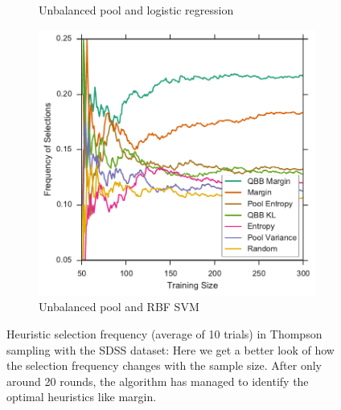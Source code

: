 \begin{figure}[p]
\begin{subfigure}{.5\textwidth}
		\caption{Unbalanced pool and logistic regression}
		\label{fig:sdss_ul_frequencies}
	\end{subfigure}%
	\begin{subfigure}{.5\textwidth}
		\centering
		\includegraphics[width=\linewidth]{figures/5_thompson/sdss_ur_frequencies}
		\caption{Unbalanced pool and RBF SVM}
		\label{fig:sdss_ur_frequencies}
	\end{subfigure}
	\caption[Heuristic selection frequency (SDSS)]{ Heuristic selection frequency (average of 10
        trials) in Thompson sampling with the SDSS dataset: Here we get a better look of how the selection
        frequency changes with the sample size. After only around 20 rounds, the algorithm has managed to
        identify the optimal heuristics like margin.} \label{fig:sdss_frequencies}
\end{figure}



